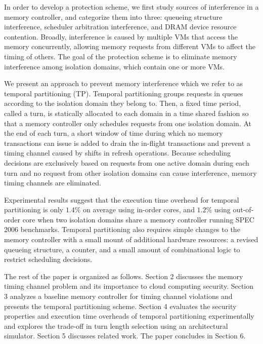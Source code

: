 In order to develop a protection scheme, we first study sources of interference
in a memory controller, and categorize them into three: queueing structure 
interference, scheduler arbitration interference, and DRAM device resource 
contention. Broadly, interference is caused by multiple VMs that access the 
memory concurrently, allowing memory requests from different VMs to affect 
the timing of others. 
The goal of the protection scheme is to eliminate memory interference among 
isolation domains, which contain one or more VMs. 

We present an approach to prevent memory interference which we 
refer to as temporal partitioning (TP). Temporal partitioning groups requests in 
queues according to the isolation domain they belong to. Then, a fixed 
time period, called a turn, is statically allocated to each domain in a time
shared fashion so that a memory controller only schedules requests from one isolation 
domain. At the end of each turn, a 
short window of time during which no memory transactions can issue is added 
to drain the in-flight transactions and prevent a timing channel caused by 
shifts in refresh operations. Because scheduling decisions are exclusively 
based on requests from one active domain during each turn and no request 
from other isolation domains can cause interference, memory timing channels
are eliminated.

Experimental results suggest that the execution time overhead for temporal 
partitioning is only $1.4\%$ on average using in-order cores, and $1.2\%$ using 
out-of-order core when two isolation domains share a memory controller running
SPEC 2006 benchmarks. 
Temporal partitioning also requires simple changes to the memory controller with
a small mount of additional hardware resources: a revised queueing structure, a counter, 
and a small amount of combinational logic to restrict scheduling decisions.

The rest of the paper is organized as follows.
Section 2 discusses the memory timing channel problem and its importance to 
cloud computing security. Section 3 analyzes a baseline memory controller for 
timing channel violations and presents the temporal partitioning scheme.  
Section 4 evaluates the security properties and execution time overheads of 
temporal partitioning experimentally and explores the trade-off in turn length 
selection using an architectural simulator. Section 5 discusses related work. 
The paper concludes in Section 6.
